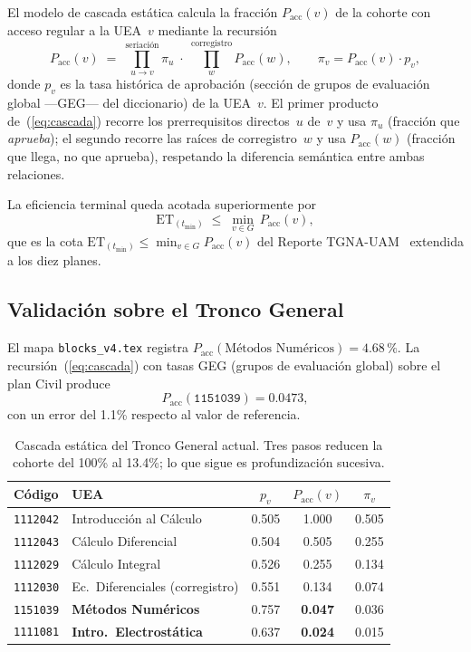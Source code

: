 \documentclass[11pt,letterpaper]{article}
\newcommand{\uea}[1]{\texttt{#1}}
\newcommand{\ET}[1]{\mathrm{ET}_{(#1)}}
\newcommand{\Pacc}{P_{\mathrm{acc}}}
\begin{document}
El modelo de cascada estática calcula la fracción $\Pacc(v)$ de la cohorte
con acceso regular a la UEA~$v$ mediante la recursión
\begin{equation}
  \Pacc(v)
  \;=\; \prod_{u\to v}^{\!\text{seriación}} \pi_u
        \;\cdot\;
        \prod_{w}^{\!\text{corregistro}} \Pacc(w),
  \qquad
  \pi_v = \Pacc(v)\cdot p_v,
  \label{eq:cascada}
\end{equation}
donde $p_v$ es la tasa histórica de aprobación (sección de grupos de evaluación global ---GEG--- del diccionario)
de la UEA~$v$.
El primer producto de~(\ref{eq:cascada}) recorre los prerrequisitos directos~$u$
de~$v$ y usa $\pi_u$ (fracción que \emph{aprueba}); el segundo recorre las
raíces de corregistro~$w$ y usa $\Pacc(w)$ (fracción que llega, no que aprueba),
respetando la diferencia semántica entre ambas relaciones.

La eficiencia terminal queda acotada superiormente por
\begin{equation}
  \ET{t_{\min}} \;\leq\; \min_{v\in G}\,\Pacc(v),
  \label{eq:cota_ET}
\end{equation}
que es la cota $\ET{t_{\min}}\leq\min_{v\in G}\Pacc(v)$ del Reporte
TGNA-UAM~\cite{TGNA2026} extendida a los diez planes.

\subsection{Validación sobre el Tronco General}

El mapa \texttt{blocks\_v4.tex} registra
$\Pacc(\text{Métodos Numéricos}) = 4.68\,\text{\%}$.
La recursión~(\ref{eq:cascada}) con tasas GEG (grupos de evaluación global) sobre el plan Civil produce
\begin{equation}
  \Pacc(\uea{1151039}) = 0.0473,
  \label{eq:validacion}
\end{equation}
con un error del 1.1\% respecto al valor de referencia.

\begin{table}[H]\centering
\caption{Cascada estática del Tronco General actual.
         Tres pasos reducen la cohorte del 100\% al 13.4\%;
         lo que sigue es profundización sucesiva.}
\label{tab:cascada_tg}
\small
\begin{tabular}{llccc}
\toprule
Código & UEA & $p_v$ & $\Pacc(v)$ & $\pi_v$ \\
\midrule
\uea{1112042} & Introducción al Cálculo          & 0.505 & 1.000 & 0.505 \\
\uea{1112043} & Cálculo Diferencial              & 0.504 & 0.505 & 0.255 \\
\uea{1112029} & Cálculo Integral                 & 0.526 & 0.255 & 0.134 \\
\uea{1112030} & Ec.\ Diferenciales (corregistro) & 0.551 & 0.134 & 0.074 \\
\uea{1151039} & \textbf{Métodos Numéricos}       & 0.757 & \textbf{0.047} & 0.036 \\
\uea{1111081} & \textbf{Intro.\ Electrostática}  & 0.637 & \textbf{0.024} & 0.015 \\
\bottomrule
\end{tabular}
\end{table}
\end{document}
